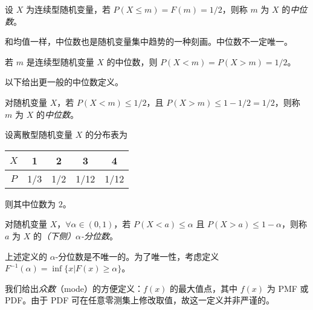 \documentclass[../main.tex]{subfiles}
\begin{document}
\begin{definition}\label{def:4.2.1}
    设 $X$ 为连续型随机变量，若 $P(X\leq m)=F(m)=1/2$，则称 $m$ 为 $X$ 的\emph{中位数}。
\end{definition}

和均值一样，中位数也是随机变量集中趋势的一种刻画。中位数不一定唯一。

若 $m$ 是连续型随机变量 $X$ 的中位数，则 $P(X<m)=P(X>m)=1/2$。

以下给出更一般的中位数定义。

\begin{definition}\label{def:4.2.2}
    对随机变量 $X$，若 $P(X<m)\leq 1/2$，且 $P(X>m)\leq 1-1/2=1/2$，则称 $m$ 为 $X$ 的\emph{中位数}。
\end{definition}

\begin{example}
    设离散型随机变量 $X$ 的分布表为

    \bigskip
    \begin{tabular}{|c|c|c|c|c|}
        \hline
        $X$ & 1   & 2   & 3    & 4    \\
        \hline
        $P$ & 1/3 & 1/2 & 1/12 & 1/12 \\
        \hline
    \end{tabular}
    \bigskip

    则其中位数为 $2$。
\end{example}

\begin{definition}\label{def:4.2.3}
    对随机变量 $X$，$\forall\alpha\in(0,1)$，若 $P(X<a)\leq\alpha$ 且 $P(X>a)\leq1-\alpha$，则称 $a$ 为 $X$ 的\emph{（下侧）$\alpha$-分位数}。
\end{definition}

上述定义的 $\alpha$-分位数是不唯一的。为了唯一性，考虑定义 $F^{-1}(\alpha)=\inf\{x|F(x)\geq\alpha\}$。

我们给出\emph{众数}（mode）的方便定义：$f(x)$ 的最大值点，其中 $f(x)$ 为 PMF 或 PDF。由于 PDF 可在任意零测集上修改取值，故这一定义并非严谨的。
\end{document}
